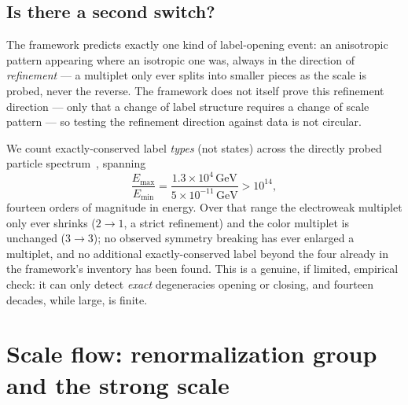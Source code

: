 \documentclass[aps,prd,twocolumn,superscriptaddress,nofootinbib]{revtex4-2}
\begin{document}
\subsection{Is there a second switch?}\label{ss:secondswitch}

The framework predicts exactly one kind of label-opening event: an
anisotropic pattern appearing where an isotropic one was, always in the
direction of \emph{refinement} — a multiplet only ever splits into
smaller pieces as the scale is probed, never the reverse. The framework
does not itself prove this refinement direction — only that a change of
label structure requires a change of scale pattern — so testing the
refinement direction against data is not circular.

We count exactly-conserved label \emph{types} (not states) across the
directly probed particle spectrum~\cite{PDG2024}, spanning
\begin{equation}
\frac{E_{\max}}{E_{\min}} = \frac{1.3\times10^{4}\,\text{GeV}}{5\times10^{-11}\,\text{GeV}} > 10^{14},
\end{equation}
fourteen orders of magnitude in energy. Over that range the electroweak
multiplet only ever shrinks ($2\to1$, a strict refinement) and the color
multiplet is unchanged ($3\to3$); no observed symmetry breaking has ever
enlarged a multiplet, and no additional exactly-conserved label beyond
the four already in the framework's inventory has been found. This is a
genuine, if limited, empirical check: it can only detect \emph{exact}
degeneracies opening or closing, and fourteen decades, while large, is
finite.

\section{Scale flow: renormalization group and the strong scale}\label{sec:flow}
\end{document}
